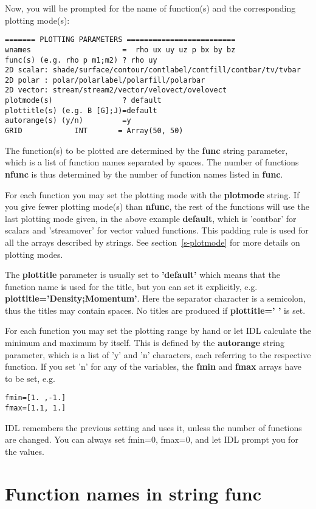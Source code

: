 \documentclass{article}
\begin{document}
Now, you will be prompted 
for the name of function(s) and the corresponding plotting mode(s):
\begin{verbatim}
======= PLOTTING PARAMETERS =========================
wnames                     =  rho ux uy uz p bx by bz
func(s) (e.g. rho p m1;m2) ? rho uy
2D scalar: shade/surface/contour/contlabel/contfill/contbar/tv/tvbar
2D polar : polar/polarlabel/polarfill/polarbar
2D vector: stream/stream2/vector/velovect/ovelovect
plotmode(s)                ? default
plottitle(s) (e.g. B [G];J)=default
autorange(s) (y/n)         =y
GRID            INT       = Array(50, 50)
\end{verbatim}
The function(s) to be plotted are determined by the {\bf func}
string parameter, which is a list of function names separated by spaces.
The number of functions {\bf nfunc} is thus determined by the number of
function names listed in {\bf func}. 

For each function you may set the plotting mode with the {\bf plotmode} string.
If you give fewer plotting mode(s) than {\bf nfunc}, the rest of
the functions will use the last plotting mode given, in the above example
{\bf default}, which is 'contbar' for scalars and 'streamover' for vector valued
functions. This padding rule is used for all the arrays described 
by strings. See section~\ref{s-plotmode} for more details on plotting modes.

The {\bf plottitle} parameter is usually set to {\bf 'default'} which
means that the function name is used for the title, but you can set it
explicitly, e.g. {\bf plottitle='Density;Momentum'}. Here the 
separator character is a semicolon, thus the titles may contain spaces.
No titles are produced if {\bf plottitle=' '} is set.

For each function you may set the plotting range by hand or let IDL
calculate the minimum and maximum by itself. This is defined by
the {\bf autorange} string parameter, which is a list of 'y' and 'n'
characters, each referring to the respective function. If you set 'n'
for any of the variables, the {\bf fmin} and {\bf fmax} arrays have
to be set, e.g.
\begin{verbatim}
fmin=[1. ,-1.]
fmax=[1.1, 1.]
\end{verbatim}
IDL remembers the previous setting and uses it, unless the number
of functions are changed. You can always set fmin=0, fmax=0, and let
IDL prompt you for the values.

\section{Function names in string func \label{s-functions}}
\end{document}
